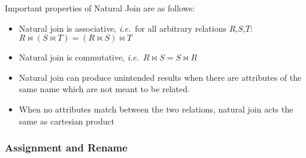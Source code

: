 \documentclass{report}
\begin{document}
         \vspace{.5cm}
         

        
        \par Important properties of Natural Join are as follows:
        \begin{itemize}
            \item Natural join is associative, \textit{i.e.}\  for all arbitrary relations $R$,$S$,$T$: $R\bowtie (S \bowtie T) = (R\bowtie S) \bowtie T$
            \item Natural join is commutative, \textit{i.e.}\ $R\bowtie S = S \bowtie R$
            \item Natural join can produce unintended results when there are attributes of the same name which are not meant to be related.
            \item When no attributes match between the two relations, natural join acts the same as cartesian product
        \end{itemize}


        \subsubsection{Assignment and Rename}
\end{document}

